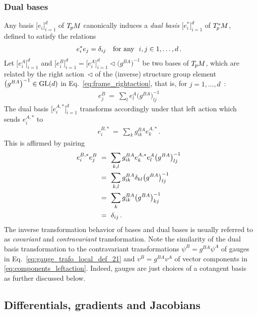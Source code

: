 \subsubsection{Dual bases}
Any basis $\big[e_i\big]_{i=1}^d$ of $T_{\mkern-1.5mu p}\mkern-.5muM$ canonically induces a \emph{dual basis} $\big[e_i^*\big]_{i=1}^d$ of $T_{\mkern-1.5mu p}^{\mkern-0mu *}\mkern-1muM$, defined to satisfy the relations
\begin{align}
    e^*_i e_j = \delta_{ij} \quad \textup{for any }\ i,j \in 1,\dots,d \,.
\end{align}
Let $\big[e^A_i\big]_{i=1}^d$ and $\big[e^B_i\big]_{i=1}^d = \big[e^A_i\big]_{i=1}^d \lhd \big(g^{BA}\big)^{-1}$ be two bases of $T_{\mkern-1.5mu p}\mkern-.5muM$, which are related by the right action~$\lhd$ of the (inverse) structure group element $\big(g^{BA}\big)^{-1} \in \operatorname{GL}(d)$ in Eq.~\eqref{eq:frame_rightaction}, that is, for $j=1,\dots,d$\ :
\begin{align}\label{eq:general_tangent_basis_gauge_trafo}
    e^B_j\ =\ \sum_l e^A_l \big(g^{BA}\big)^{-1}_{lj}
\end{align}
The dual basis $\big[e^{A,*}_i\big]_{i=1}^d$ transforms accordingly under that left action which sends $e_i^{A,*}$ to
\begin{align}\label{eq:general_cotangent_basis_gauge_trafo}
    e_i^{B,*}\ =\ \sum_k g^{BA}_{ik} e_k^{A,*} \,.
\end{align}
This is affirmed by pairing
\begin{align}
    e_i^{B,*} e_j^B
    \ &=\ \sum_{k,l} g^{BA}_{ik} e_k^{A,*} e_l^A \big(g^{BA}\big)^{-1}_{lj}  \notag \\
    \ &=\ \sum_{k,l} g^{BA}_{ik} \delta_{kl} \big(g^{BA}\big)^{-1}_{lj} \notag \\
    \ &=\ \sum_{k} g^{BA}_{ik} \big(g^{BA}\big)^{-1}_{kj} \notag \\
    \ &=\ \delta_{ij} \,.
\end{align}
The inverse transformation behavior of bases and dual bases is usually referred to as \emph{covariant} and \emph{contravariant} transformation.
Note the similarity of the dual basis transformation to the contravariant transformations $\psi^B = g^{BA} \psi^A$ of gauges in Eq.~\eqref{eq:gauge_trafo_local_def_21} and $v^B = g^{BA} v^A$ of vector components in \eqref{eq:components_leftaction}.
Indeed, gauges are just choices of a cotangent basis as further discussed below.








\subsection{Differentials, gradients and Jacobians}
\label{apx:differentials_gradients_jacobians}

